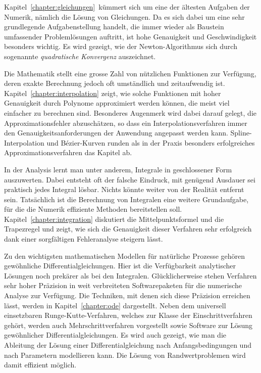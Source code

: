 Kapitel~\ref{chapter:gleichungen} kümmert sich um eine der ältesten
Aufgaben der Numerik, nämlich die Lösung von Gleichungen.
%
%
Da es sich dabei um eine sehr grundlegende Aufgabenstellung handelt,
die immer wieder als Baustein umfassender Problemlösungen auftritt,
ist hohe Genauigkeit und Geschwindigkeit besonders wichtig.
Es wird gezeigt, wie der Newton-Algorithmus sich durch sogenannte
{\em quadratische Konvergenz} auszeichnet.
%

Die Mathematik stellt eine grosse Zahl von nützlichen Funktionen zur
Verfügung, deren exakte Berechnung jedoch oft umständlich und
zeitaufwendig ist.
%
Kapitel~\ref{chapter:interpolation} zeigt, wie solche Funktionen
mit hoher Genauigkeit durch Polynome approximiert werden können,
die meist viel einfacher zu berechnen sind.
%
Besonderes Augenmerk wird dabei darauf gelegt, die Approximationsfehler
abzuschätzen, so dass ein Interpolationsverfahren immer den
Genauigkeitsanforderungen der Anwendung angepasst werden kann.
%
Spline-Interpolation und Bézier-Kurven runden als in der Praxis besonders
erfolgreiches Approximationsverfahren das Kapitel ab.
%
%

In der Analysis lernt man unter anderem, Integrale in geschlossener
Form auszuwerten.
%
Dabei entsteht oft der falsche Eindruck, mit genügend Ausdauer sei praktisch
jedes Integral lösbar.
Nichts könnte weiter von der Realität entfernt sein.
Tatsächlich ist die Berechnung von Integralen eine weitere Grundaufgabe,
für die die Numerik effiziente Methoden bereitstellen soll.
Kapitel~\ref{chapter:integration} diskutiert die Mittelpunktsformel und
die Trapezregel und zeigt, wie sich die Genauigkeit dieser Verfahren
sehr erfolgreich dank einer sorgfältigen Fehleranalyse steigern lässt.
%
%

Zu den wichtigsten mathematischen Modellen für natürliche Prozesse
gehören gewöhnliche Differentialgleichungen.
%
%
Hier ist die Verfügbarkeit analytischer Lösungen noch prekärer als
bei den Integralen.
%
%
Glücklicherweise stehen Verfahren sehr hoher Präzision in weit
verbreiteten Softwarepaketen für die numerische Analyse zur Verfügung.
%
Die Techniken, mit denen sich diese Präzision erreichen lässt,
werden in Kapitel~\ref{chapter:ode} dargestellt.
Neben dem universell einsetzbaren Runge-Kutte-Verfahren, welches zur
Klasse der Einschrittverfahren gehört, werden auch Mehrschrittverfahren
vorgestellt sowie Software zur Lösung gewöhnlicher Differentialgleichungen.
%
%
%
Es wird auch gezeigt, wie man die Ableitung der Lösung einer 
Differentialgleichung nach Anfangsbedingungen und nach Parametern modellieren
kann.
%
%
Die Lösung von Randwertproblemen wird damit effizient möglich.
%

